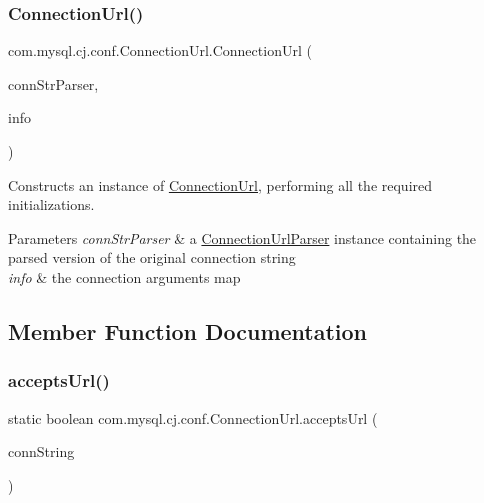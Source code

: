 \subsubsection{\texorpdfstring{Connection\+Url()}{ConnectionUrl()}\hspace{0.1cm}{\footnotesize\ttfamily [3/3]}}
{\footnotesize\ttfamily com.\+mysql.\+cj.\+conf.\+Connection\+Url.\+Connection\+Url (\begin{DoxyParamCaption}\item[{\mbox{\hyperlink{classcom_1_1mysql_1_1cj_1_1conf_1_1_connection_url_parser}{Connection\+Url\+Parser}}}]{conn\+Str\+Parser,  }\item[{Properties}]{info }\end{DoxyParamCaption})\hspace{0.3cm}{\ttfamily [protected]}}

Constructs an instance of \mbox{\hyperlink{classcom_1_1mysql_1_1cj_1_1conf_1_1_connection_url}{Connection\+Url}}, performing all the required initializations.


\begin{DoxyParams}{Parameters}
{\em conn\+Str\+Parser} & a \mbox{\hyperlink{classcom_1_1mysql_1_1cj_1_1conf_1_1_connection_url_parser}{Connection\+Url\+Parser}} instance containing the parsed version of the original connection string \\
\hline
{\em info} & the connection arguments map \\
\hline
\end{DoxyParams}


\subsection{Member Function Documentation}
\mbox{\label{classcom_1_1mysql_1_1cj_1_1conf_1_1_connection_url_a8ec478bacf5da8da5353206a73d669c7}} 
\subsubsection{\texorpdfstring{accepts\+Url()}{acceptsUrl()}}
{\footnotesize\ttfamily static boolean com.\+mysql.\+cj.\+conf.\+Connection\+Url.\+accepts\+Url (\begin{DoxyParamCaption}\item[{String}]{conn\+String }\end{DoxyParamCaption})\hspace{0.3cm}{\ttfamily [static]}}

